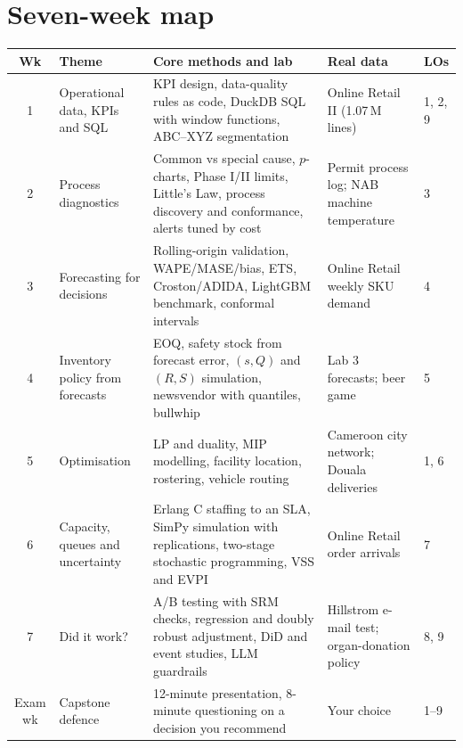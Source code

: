 \section*{Seven-week map}
\begin{center}\small
\begin{tabularx}{\linewidth}{@{}c L{3.0cm} Y L{2.5cm} L{1.7cm}@{}}
\toprule
\textbf{Wk} & \textbf{Theme} & \textbf{Core methods and lab} & \textbf{Real data} & \textbf{LOs}\\ & Operational data, KPIs and SQL & KPI design, data-quality rules as code, DuckDB SQL with window functions, ABC--XYZ segmentation & Online Retail II (1.07\,M lines) & 1, 2, 9\\
2 & Process diagnostics & Common vs special cause, $p$-charts, Phase I/II limits, Little's Law, process discovery and conformance, alerts tuned by cost & Permit process log; NAB machine temperature & 3\\
3 & Forecasting for decisions & Rolling-origin validation, WAPE/MASE/bias, ETS, Croston/ADIDA, LightGBM benchmark, conformal intervals & Online Retail weekly SKU demand & 4\\
4 & Inventory policy from forecasts & EOQ, safety stock from forecast error, $(s,Q)$ and $(R,S)$ simulation, newsvendor with quantiles, bullwhip & Lab 3 forecasts; beer game & 5\\
5 & Optimisation & LP and duality, MIP modelling, facility location, rostering, vehicle routing & Cameroon city network; Douala deliveries & 1, 6\\
6 & Capacity, queues and uncertainty & Erlang C staffing to an SLA, SimPy simulation with replications, two-stage stochastic programming, VSS and EVPI & Online Retail order arrivals & 7\\
7 & Did it work? & A/B testing with SRM checks, regression and doubly robust adjustment, DiD and event studies, LLM guardrails & Hillstrom e-mail test; organ-donation policy & 8, 9\\
\midrule
Exam wk & Capstone defence & 12-minute presentation, 8-minute questioning on a decision you recommend & Your choice & 1--9\\
\bottomrule
\end{tabularx}
\end{center}

